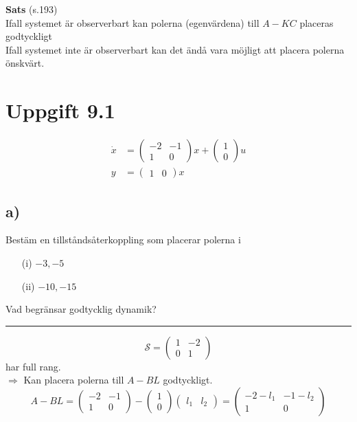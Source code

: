 \documentclass[12pt]{article}
\newcommand{\qline}{\hrule \vspace*{10pt}}
\begin{document}
\textbf{Sats} (s.193) \\
Ifall systemet är observerbart kan polerna (egenvärdena) till $A-KC$ placeras godtyckligt\\

Ifall systemet inte är observerbart kan det ändå vara möjligt att placera polerna önskvärt.

\section{Uppgift 9.1}

\begin{align*}
\dot{x} &= \begin{pmatrix}
-2 & -1 \\
1 & 0
\end{pmatrix}x + \begin{pmatrix}
1 \\
0
\end{pmatrix}u \\
y &= \begin{pmatrix}
1 & 0
\end{pmatrix}x
\end{align*}

\subsection*{a)}
Bestäm en tillståndsåterkoppling som placerar polerna i
\begin{itemize}
\item[(i)] $-3,-5$ \\
\item[(ii)] $-10, -15$
\end{itemize} 
Vad begränsar godtycklig dynamik?
\qline
\[\mathcal{S} = \begin{pmatrix}
1 & -2 \\
0 & 1
\end{pmatrix} \]
har full rang. \\
$\Rightarrow$ Kan placera polerna till $A-BL$ godtyckligt.
\[A-BL = \begin{pmatrix}
-2 & -1 \\
1 & 0
\end{pmatrix} - \begin{pmatrix}
1 \\
0
\end{pmatrix} \begin{pmatrix}
l_1 & l_2
\end{pmatrix} = \begin{pmatrix}
-2-l_1 & -1-l_2 \\
1 & 0
\end{pmatrix} \]
\end{document}
